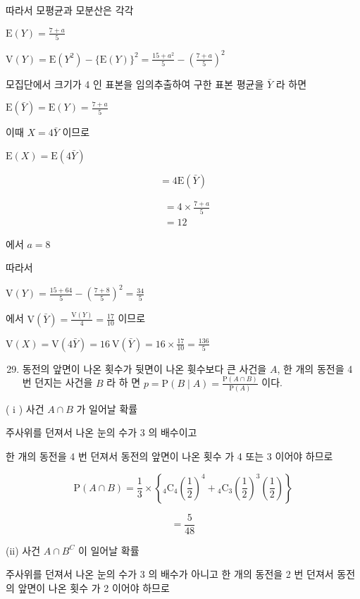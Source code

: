 \documentclass[10pt]{article}
\begin{document}
따라서 모평균과 모분산은 각각

\(\mathrm{E}(Y)=\frac{7+a}{5}\)

\(\mathrm{V}(Y)=\mathrm{E}\left(Y^{2}\right)-\{\mathrm{E}(Y)\}^{2}=\frac{15+a^{2}}{5}-\left(\frac{7+a}{5}\right)^{2}\)

모집단에서 크기가 4 인 표본을 임의추출하여 구한 표본 평균을 \(\bar{Y}\) 라 하면

\(\mathrm{E}(\bar{Y})=\mathrm{E}(Y)=\frac{7+a}{5}\)

이때 \(X=4 \bar{Y}\) 이므로

\(\mathrm{E}(X)=\mathrm{E}(4 \bar{Y})\)

\[
=4 \mathrm{E}(\bar{Y})
\]

\[
\begin{aligned}
& =4 \times \frac{7+a}{5} \\
& =12
\end{aligned}
\]

에서 \(a=8\)

따라서

\(\mathrm{V}(Y)=\frac{15+64}{5}-\left(\frac{7+8}{5}\right)^{2}=\frac{34}{5}\)

에서 \(\mathrm{V}(\bar{Y})=\frac{\mathrm{V}(Y)}{4}=\frac{17}{10}\) 이므로

\(\mathrm{V}(X)=\mathrm{V}(4 \bar{Y})=16 \mathrm{~V}(\bar{Y})=16 \times \frac{17}{10}=\frac{136}{5}\)

\begin{enumerate}
  \setcounter{enumi}{28}
  \item 동전의 앞면이 나온 횟수가 뒷면이 나온 휫수보다 큰 사건을 \(A\), 한 개의 동전을 4 번 던지는 사건을 \(B\) 라 하 면 \(p=\mathrm{P}(B \mid A)=\frac{\mathrm{P}(A \cap B)}{\mathrm{P}(A)}\) 이다.
\end{enumerate}

( i ) 사건 \(A \cap B\) 가 일어날 확률

주사위를 던져서 나온 눈의 수가 3 의 배수이고

한 개의 동전을 4 번 던져서 동전의 앞면이 나온 횟수 가 4 또는 3 이어야 하므로

\[
\mathrm{P}(A \cap B)=\frac{1}{3} \times\left\{{ }_{4} \mathrm{C}_{4}\left(\frac{1}{2}\right)^{4}+{ }_{4} \mathrm{C}_{3}\left(\frac{1}{2}\right)^{3}\left(\frac{1}{2}\right)\right\}
\]

\[
=\frac{5}{48}
\]

(ii) 사건 \(A \cap B^{C}\) 이 일어날 확률

주사위를 던져서 나온 눈의 수가 3 의 배수가 아니고 한 개의 동전을 2 번 던져서 동전의 앞면이 나온 횟수 가 2 이어야 하므로
\end{document}
